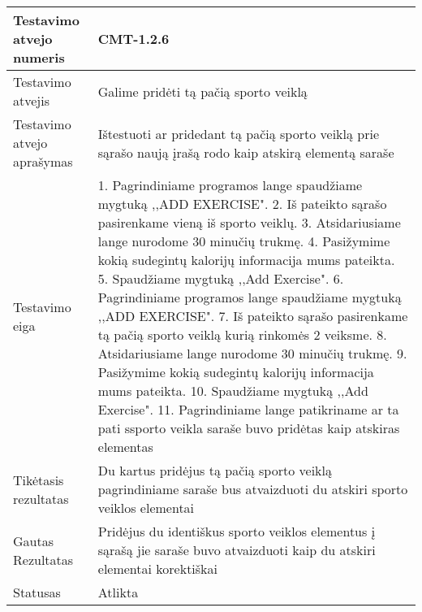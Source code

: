 \documentclass[oneside]{VUMIFPSkursinis}
\begin{document}
\begin{center}
    \begin{tabular}{ |p{5cm}|p{13cm}|}
    \hline
        Testavimo atvejo numeris &  CMT-1.2.6\\ \hline
        Testavimo atvejis & Galime pridėti tą pačią sporto veiklą  \\ \hline
        Testavimo atvejo aprašymas & Ištestuoti ar pridedant tą pačią sporto veiklą prie sąrašo naują įrašą rodo kaip atskirą elementą saraše  \\ \hline
        Testavimo eiga &  1. Pagrindiniame programos lange spaudžiame mygtuką ,,ADD EXERCISE". 
				2. Iš pateikto sąrašo pasirenkame vieną iš sporto veiklų. 
				3. Atsidariusiame lange nurodome 30 minučių trukmę.
				4. Pasižymime kokią sudegintų kalorijų informacija mums pateikta. 
				5. Spaudžiame mygtuką ,,Add Exercise".
				6. Pagrindiniame programos lange spaudžiame mygtuką ,,ADD EXERCISE".
				7. Iš pateikto sąrašo pasirenkame tą pačią sporto veiklą kurią rinkomės 2 veiksme.
				8. Atsidariusiame lange nurodome 30 minučių trukmę.
				9. Pasižymime kokią sudegintų kalorijų informacija mums pateikta.
				10. Spaudžiame mygtuką ,,Add Exercise".
				11. Pagrindiniame lange patikriname ar ta pati ssporto veikla saraše buvo pridėtas kaip atskiras elementas \\ \hline
        Tikėtasis rezultatas &  Du kartus pridėjus tą pačią sporto veiklą pagrindiniame saraše bus atvaizduoti du atskiri sporto veiklos elementai\\ \hline
        Gautas Rezultatas &  Pridėjus du identiškus sporto veiklos elementus į sąrašą jie saraše buvo atvaizduoti kaip du atskiri elementai korektiškai\\ \hline
        Statusas & Atlikta \\ \hline
    \hline
    \end{tabular}
\end{center}
\end{document}

